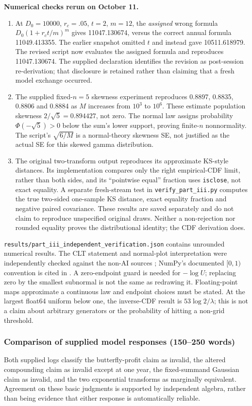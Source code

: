 \textbf{Numerical checks rerun on October 11.}
\begin{enumerate}
\item At $D_0=10000$, $r_c=.05$, $t=2$, $m=12$, the \emph{assigned} wrong formula $D_0(1+r_ct/m)^m$ gives 11047.130674, versus the correct annual formula 11049.413355. The earlier snapshot omitted $t$ and instead gave 10511.618979. The revised script now evaluates the assigned formula and reproduces 11047.130674. The supplied declaration identifies the revision as post-session re-derivation; that disclosure is retained rather than claiming that a fresh model exchange occurred.
\item The supplied fixed-$n=5$ skewness experiment reproduces 0.8897, 0.8835, 0.8806 and 0.8884 as $M$ increases from $10^3$ to $10^6$. These estimate population skewness $2/\sqrt5=0.894427$, not zero. The normal law assigns probability $\Phi(-\sqrt5)>0$ below the sum's lower support, proving finite-$n$ nonnormality. The script's $\sqrt{6/M}$ is a normal-theory skewness SE, not justified as the actual SE for this skewed gamma distribution.
\item The original two-transform output reproduces its approximate KS-style distances. Its implementation compares only the right empirical-CDF limit, rather than both sides, and its ``pointwise equal'' fraction uses \texttt{isclose}, not exact equality. A separate fresh-stream test in \texttt{verify\_part\_iii.py} computes the true two-sided one-sample KS distance, exact equality fraction and negative paired covariance. These results are saved separately and do not claim to reproduce unspecified original draws. Neither a non-rejection nor rounded equality proves the distributional identity; the CDF derivation does.
\end{enumerate}
\texttt{results/part\_iii\_independent\_verification.json} contains unrounded numerical results. The CLT statement and normal-plot interpretation were independently checked against the non-AI sources \cite{clt,qq}; NumPy's documented $[0,1)$ convention is cited in \cite{rng}. A zero-endpoint guard is needed for $-\log U$; replacing zero by the smallest subnormal is not the same as redrawing it. Floating-point maps approximate a continuous law and endpoint choices must be stated. At the largest float64 uniform below one, the inverse-CDF result is $53\log2/\lambda$; this is not a claim about arbitrary generators or the probability of hitting a non-grid threshold.

\subsubsection*{Comparison of supplied model responses (150--250 words)}
Both supplied logs classify the butterfly-profit claim as invalid, the altered compounding claim as invalid except at one year, the fixed-summand Gaussian claim as invalid, and the two exponential transforms as marginally equivalent. Agreement on these basic judgments is supported by independent algebra, rather than being evidence that either response is automatically reliable.

